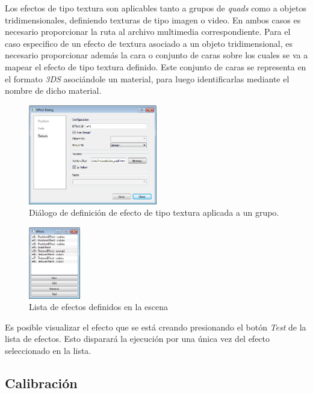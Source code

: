 Los efectos de tipo textura son aplicables tanto a grupos de \emph{quads} como a objetos tridimensionales, definiendo texturas de tipo imagen o video. En ambos casos es necesario proporcionar la ruta al archivo multimedia correspondiente. Para el caso especifico de un efecto de textura asociado a un objeto tridimensional, es necesario proporcionar además la cara o conjunto de caras sobre los cuales se va a mapear el efecto de tipo textura definido. Este conjunto de caras se representa en el formato \emph{3DS} asociándole un material, para luego identificarlas mediante el nombre de dicho material.

\begin{figure}[H]
  \centering
    \includegraphics[width=0.5\textwidth]{./Cap5_vmt/vmt_EfectDialog3.png}
  \caption{Diálogo de definición de efecto de tipo textura aplicada a un grupo.}
  \label{fig:VMT-EffectTexture}
\end{figure}

\begin{figure}[H]
  \centering
    \includegraphics[width=0.2\textwidth]{./Cap5_vmt/vmt_Efects.png}
  \caption{Lista de efectos definidos en la escena}
  \label{fig:VMT-EffectList}
\end{figure}

Es posible visualizar el efecto que se está creando presionando el botón \emph{Test} de la lista de efectos. Esto disparará la ejecución por una única vez del efecto seleccionado en la lista.

\subsection{Calibración}

